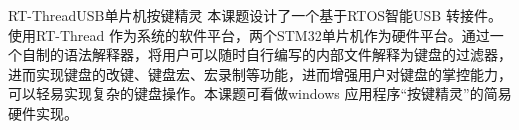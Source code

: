 
\begin{Cabstract}{RT-Thread}{USB}{单片机}{按键精灵}{}
本课题设计了一个基于RTOS智能USB 转接件。使用RT-Thread 作为系统的软件平台，两个STM32单片机作为硬件平台。通过一个自制的语法解释器，将用户可以随时自行编写的内部文件解释为键盘的过滤器，进而实现键盘的改键、键盘宏、宏录制等功能，进而增强用户对键盘的掌控能力，可以轻易实现复杂的键盘操作。本课题可看做windows 应用程序“按键精灵”的简易硬件实现。
\end{Cabstract}
